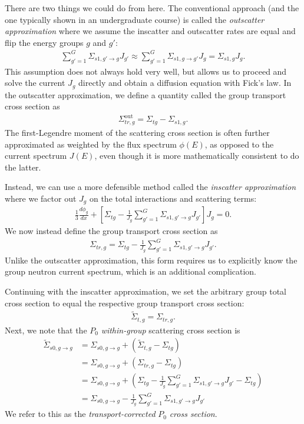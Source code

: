 There are two things we could do from here. The conventional approach (and the one typically shown in an undergraduate course) is called the \emph{outscatter approximation} where we assume the inscatter and outscatter rates are equal and flip the energy groups $g$ and $g'$:
\begin{align}
  \sum_{g'=1}^G \Sigma_{s1,g' \rightarrow g} J_{g'} \approx  \sum_{g'=1}^G \Sigma_{s1,g \rightarrow g'} J_{g} = \Sigma_{s1,g} J_g . \nonumber
\end{align}
This assumption does not always hold very well, but allows us to proceed and solve the current $J_g$ directly and obtain a diffusion equation with Fick's law. In the outscatter approximation, we define a quantity called the group transport cross section as
\begin{align}
  \Sigma_{tr,g}^\text{out} = \Sigma_{tg} - \Sigma_{s1,g} .
\end{align}
The first-Legendre moment of the scattering cross section is often further approximated as weighted by the flux spectrum $\phi(E)$, as opposed to the current spectrum $J(E)$, even though it is more mathematically consistent to do the latter.

Instead, we can use a more defensible method called the \emph{inscatter approximation} where we factor out $J_g$ on the total interactions and scattering terms:
\begin{align}
  \frac{1}{3} \frac{d\phi_g}{dx} +  \left[ \Sigma_{tg} - \frac{1}{J_g} \sum_{g'=1}^G \Sigma_{s1,g' \rightarrow g} J_{g'} \right] J_g = 0. 
\end{align} 
We now instead define the group transport cross section as
\begin{align}
  \Sigma_{tr,g} = \Sigma_{tg} - \frac{1}{J_g} \sum_{g'=1}^G \Sigma_{s1,g' \rightarrow g} J_{g'} .
\end{align}
Unlike the outscatter approximation, this form requires us to explicitly know the group neutron current spectrum, which is an additional complication.

Continuing with the inscatter approximation, we set the arbitrary group total cross section to equal the respective group transport cross section:
\begin{align}
  \widetilde{\Sigma}_{t,g} = \Sigma_{tr,g} . \nonumber
\end{align}
Next, we note that the $P_0$ \emph{within-group} scattering cross section is
\begin{align}
  \widetilde{\Sigma}_{s0,g \rightarrow g} 
  &= \Sigma_{s0,g \rightarrow g} + (  \widetilde{\Sigma}_{t,g} - \Sigma_{tg} ) \nonumber \\
  &= \Sigma_{s0,g \rightarrow g} + ( \Sigma_{tr,g} - \Sigma_{tg} ) \nonumber \\
  &= \Sigma_{s0,g \rightarrow g} + ( \Sigma_{tg} - \frac{1}{J_g} \sum_{g'=1}^G \Sigma_{s1,g' \rightarrow g} J_{g'} - \Sigma_{tg} ) \nonumber \\
  &= \Sigma_{s0,g \rightarrow g} - \frac{1}{J_g} \sum_{g'=1}^G \Sigma_{s1,g' \rightarrow g} J_{g'}
\end{align}
We refer to this as the \emph{transport-corrected} $P_0$ \emph{cross section}.

